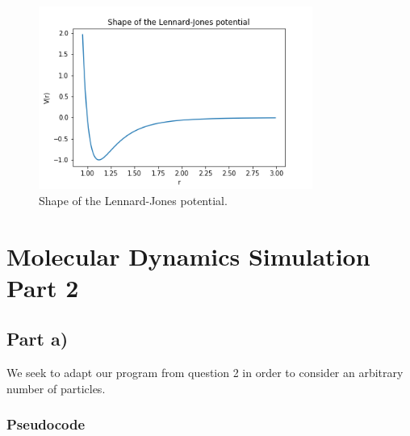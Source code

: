 \documentclass{article}
\begin{document}
\begin{figure}[H]
	\centering
	\includegraphics[width=0.8\textwidth]{../images/q2_c.png}
	\caption{Shape of the Lennard-Jones potential.}
	\label{fig:q2_c}
\end{figure}

\section{Molecular Dynamics Simulation Part 2}

\subsection{Part a)}

We seek to adapt our program from question 2 in order to consider an arbitrary number of particles.

\subsubsection{Pseudocode}
\end{document}
